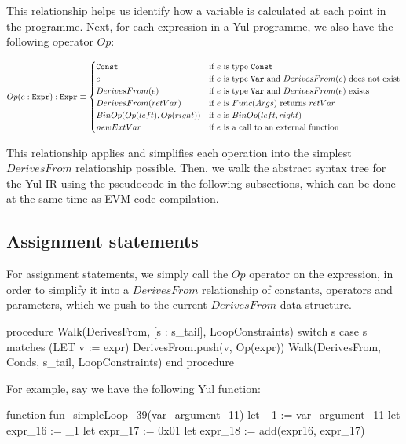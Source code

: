 This relationship helps us identify how a variable is calculated at each point in the programme. Next,
for each expression in a Yul programme, we also have the following operator $Op$:


\begin{dmath}
  Op(e: \texttt{Expr}): \texttt{Expr} \equiv
  \begin{cases}
    \texttt{Const} & \text{if $e$ is type \texttt{Const}} \\
    e & \text{if $e$ is type \texttt{Var} and $DerivesFrom(e)$ does not exist} \\
    DerivesFrom(e) & \text{if $e$ is type \texttt{Var} and $DerivesFrom(e)$ exists} \\
    DerivesFrom(retVar) & \text{if $e$ is $Func(Args)$ returns $retVar$} \\
    BinOp(Op(left), Op(right)) & \text{if $e$ is $BinOp(left, right)$} \\
    newExtVar & \text{if $e$ is a call to an external function}
  \end{cases}
\end{dmath}

This relationship applies and simplifies each operation into the simplest $DerivesFrom$ relationship possible.
Then, we walk the abstract syntax tree for the Yul IR using the pseudocode in the following subsections, 
which can be done at the same time as EVM code compilation.

\subsection{Assignment statements}

For assignment statements, we simply call the $Op$ operator on the expression,
in order to simplify it into a $DerivesFrom$ relationship of constants, operators and 
parameters, which we push to the current $DerivesFrom$ data structure.

\begin{sflisting}
  procedure Walk(DerivesFrom, [s : s_tail], LoopConstraints)
    switch s
      case s matches (LET v := expr)
        DerivesFrom.push(v, Op(expr))
        Walk(DerivesFrom, Conds, s_tail, LoopConstraints)
  end procedure 
\end{sflisting}

For example, say we have the following Yul function:
\begin{sflisting}
  function fun_simpleLoop_39(var_argument_11) {
    let _1 := var_argument_11
    let expr_16 := _1
    let expr_17 := 0x01
    let expr_18 := add(expr16, expr_17)
}
\end{sflisting}

